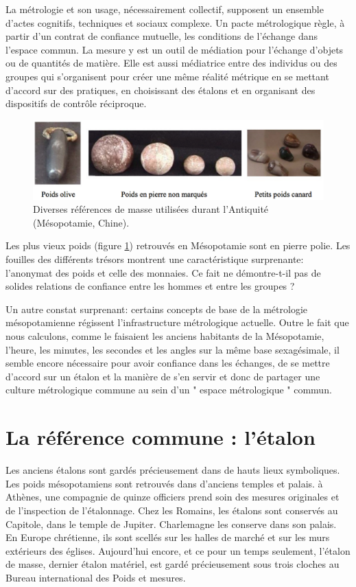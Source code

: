 La métrologie et son usage, nécessairement collectif, supposent un ensemble d'actes cognitifs, techniques et sociaux complexe.  Un pacte métrologique règle, à partir d'un contrat de confiance mutuelle, les conditions de l'échange dans l'espace commun.  La mesure y est un outil de médiation pour l'échange d'objets ou de quantités de matière.  Elle est aussi médiatrice entre des individus ou des groupes qui s'organisent pour créer une même réalité métrique en se mettant d'accord sur des pratiques, en choisissant des étalons et en organisant des dispositifs de contrôle réciproque.

\begin{figure}[h]
    \centering
    \includegraphics[width=15cm]{assets/figures/poids.pdf}
    \caption{Diverses références de masse utilisées durant l'Antiquité (Mésopotamie, Chine).}
    \label{fig:1.1}
\end{figure}
Les plus vieux poids (figure \ref{fig:1.1}) retrouvés en Mésopotamie sont en pierre polie.  Les fouilles des différents trésors montrent une caractéristique surprenante: l'anonymat des poids et celle des monnaies.  Ce fait ne démontre-t-il pas de solides relations de confiance entre les hommes et entre les groupes ?

Un autre constat surprenant: certains concepts de base de la métrologie mésopotamienne régissent l'infrastructure métrologique actuelle. Outre le fait que nous calculons, comme le faisaient les anciens habitants de la Mésopotamie, l'heure, les minutes, les secondes et les angles sur la même base sexagésimale, il semble encore nécessaire pour avoir confiance dans les échanges, de se mettre d'accord sur un étalon et la manière de s'en servir et donc de partager une culture métrologique commune au sein d'un " espace métrologique " commun.

\section{La référence commune : l'étalon}

Les anciens étalons sont gardés précieusement dans de hauts lieux symboliques.  Les poids mésopotamiens sont retrouvés dans d'anciens temples et palais.  à Athènes, une compagnie de quinze officiers prend soin des mesures originales et de l'inspection de l'étalonnage.  Chez les Romains, les étalons sont conservés au Capitole, dans le temple de Jupiter. Charlemagne les conserve dans son palais.  En Europe chrétienne, ils sont scellés sur les halles de marché et sur les murs extérieurs des églises.  Aujourd'hui encore, et ce pour un temps seulement, l'étalon de masse, dernier étalon matériel, est gardé précieusement sous trois cloches au Bureau international des Poids et mesures.

